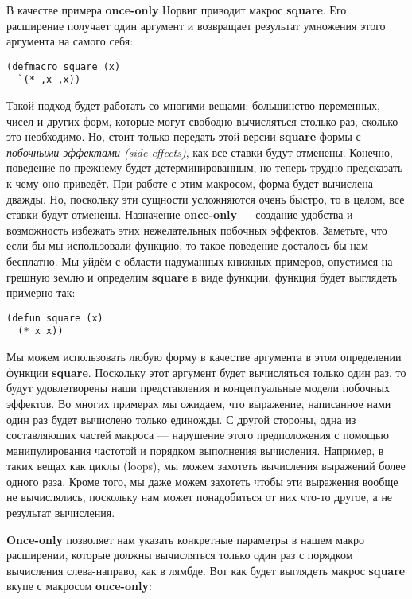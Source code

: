 В качестве примера \textbf{once-only} Норвиг приводит макрос \textbf{square}. Его расширение получает один аргумент и возвращает результат умножения этого аргумента на самого себя:

\begin{verbatim}
(defmacro square (x)
  `(* ,x ,x))
\end{verbatim}

Такой подход будет работать со многими вещами: большинство переменных, чисел и других форм, которые могут свободно вычисляться столько раз, сколько это необходимо. Но, стоит только передать этой версии \textbf{square} формы с \emph{побочными эффектами (side-effects)}, как все ставки будут отменены. Конечно, поведение по прежнему будет детерминированным, но теперь трудно предсказать к чему оно приведёт. При работе с этим макросом, форма будет вычислена дважды. Но, поскольку эти сущности усложняются очень быстро, то в целом, все ставки будут отменены. Назначение \textbf{once-only} --- создание удобства и возможность избежать этих нежелательных побочных эффектов. Заметьте, что если бы мы использовали функцию, то такое поведение досталось бы нам бесплатно. Мы уйдём с области надуманных книжных примеров, опустимся на грешную землю и определим \textbf{square} в виде функции, функция будет выглядеть примерно так:

\begin{verbatim}
(defun square (x)
  (* x x))
\end{verbatim}

Мы можем использовать любую форму в качестве аргумента в этом определении функции \textbf{square}. Поскольку этот аргумент будет вычисляться только один раз, то будут удовлетворены наши представления и концептуальные модели побочных эффектов. Во многих примерах мы ожидаем, что выражение, написанное нами один раз будет вычислено только единожды. С другой стороны, одна из составляющих частей макроса --- нарушение этого предположения с помощью манипулирования частотой и порядком выполнения вычисления. Например, в таких вещах как циклы (loops), мы можем захотеть вычисления выражений более одного раза. Кроме того, мы даже можем захотеть чтобы эти выражения вообще не вычислялись, поскольку нам может понадобиться от них что-то другое, а не результат вычисления.

\textbf{Once-only} позволяет нам указать конкретные параметры в нашем макро расширении, которые должны вычисляться только один раз с порядком вычисления слева-направо, как в лямбде. Вот как будет выглядеть макрос \textbf{square} вкупе с макросом \textbf{once-only}:

